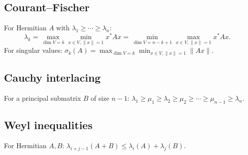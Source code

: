 \subsection{Courant--Fischer}
\label{subsec:courant-fischer}

For Hermitian $A$ with $\lambda_1\ge\cdots\ge\lambda_n$:
$$\lambda_k=\max_{\dim V=k}\min_{x\in V,\|x\|=1}x^*Ax=\min_{\dim V=n-k+1}\max_{x\in V,\|x\|=1}x^*Ax.$$
For singular values: $\sigma_k(A)=\max_{\dim V=k}\min_{x\in V,\|x\|=1}\|Ax\|$.

\subsection{Cauchy interlacing}
\label{subsec:cauchy-interlacing}

For a principal submatrix $B$ of size $n-1$: $\lambda_1\ge\mu_1\ge\lambda_2\ge\mu_2\ge\cdots\ge\mu_{n-1}\ge\lambda_n$.

\subsection{Weyl inequalities}
\label{subsec:weyl}

For Hermitian $A,B$: $\lambda_{i+j-1}(A+B)\le\lambda_i(A)+\lambda_j(B)$.

